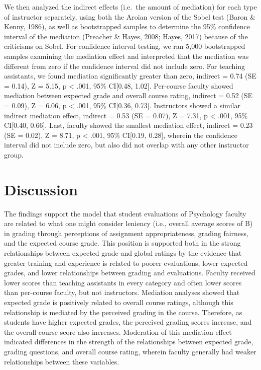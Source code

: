 \documentclass[man]{apa6}
\theoremstyle{definition}
\theoremstyle{definition}
\theoremstyle{definition}
\theoremstyle{remark}
\begin{document}
We then analyzed the indirect effects (i.e.~the amount of mediation) for
each type of instructor separately, using both the Aroian version of the
Sobel test (Baron \& Kenny, 1986), as well as bootstrapped samples to
determine the 95\% confidence interval of the mediation (Preacher \&
Hayes, 2008; Hayes, 2017) because of the criticisms on Sobel. For
confidence interval testing, we ran 5,000 bootstrapped samples examining
the mediation effect and interpreted that the mediation was different
from zero if the confidence interval did not include zero. For teaching
assistants, we found mediation significantly greater than zero, indirect
= 0.74 (SE = 0.14), Z = 5.15, p \textless{} .001, 95\% CI{[}0.48,
1.02{]}. Per-course faculty showed mediation between expected grade and
overall course rating, indirect = 0.52 (SE = 0.09), Z = 6.06, p
\textless{} .001, 95\% CI{[}0.36, 0.73{]}. Instructors showed a similar
indirect mediation effect, indirect = 0.53 (SE = 0.07), Z = 7.31, p
\textless{} .001, 95\% CI{[}0.40, 0.66{]}. Last, faculty showed the
smallest mediation effect, indirect = 0.23 (SE = 0.02), Z = 8.71, p
\textless{} .001, 95\% CI{[}0.19, 0.28{]}, wherein the confidence
interval did not include zero, but also did not overlap with any other
instructor group.

\hypertarget{discussion}{%
\section{Discussion}\label{discussion}}

The findings support the model that student evaluations of Psychology
faculty are related to what one might consider leniency (i.e., overall
average scores of B) in grading through perceptions of assignment
appropriateness, grading fairness, and the expected course grade. This
position is supported both in the strong relationships between expected
grade and global ratings by the evidence that greater training and
experience is related to poorer evaluations, lower expected grades, and
lower relationships between grading and evaluations. Faculty received
lower scores than teaching assistants in every category and often lower
scores than per-course faculty, but not instructors. Mediation analyses
showed that expected grade is positively related to overall course
ratings, although this relationship is mediated by the perceived grading
in the course. Therefore, as students have higher expected grades, the
perceived grading scores increase, and the overall course score also
increases. Moderation of this mediation effect indicated differences in
the strength of the relationships between expected grade, grading
questions, and overall course rating, wherein faculty generally had
weaker relationships between these variables.
\end{document}

